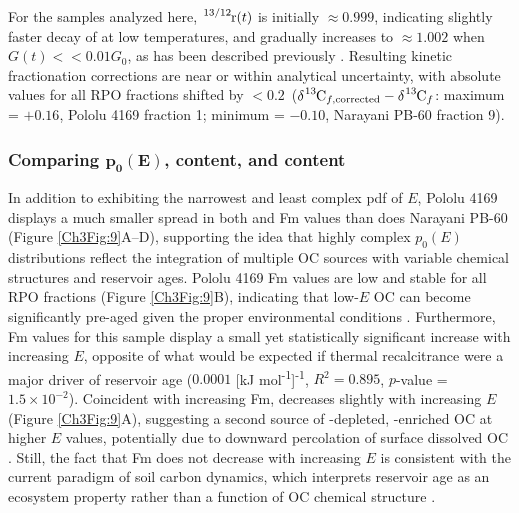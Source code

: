 For the samples analyzed here,  $\ce{^{13/12}r}(t)$ is initially $\approx 0.999$, indicating slightly faster decay of  at low temperatures, and gradually increases to $\approx 1.002$ when $G(t) << 0.01 G_{0}$,  as has been described previously \citep{Cramer:2004tg,Hemingway:2016rc}. Resulting kinetic fractionation corrections are near or within analytical uncertainty, with absolute  values for all RPO fractions shifted by $< 0.2$\textperthousand\ ($\ce{\delta^{13}C}_{f, \text{corrected}} - \ce{\delta^{13}C}_{f}$: maximum = $+0.16$\textperthousand, Pololu 4169 fraction 1; minimum = $-0.10$\textperthousand, Narayani PB-60 fraction 9).

\subsubsection{Comparing $\bm{p_{0}(E)}$,  content, and  content}

In addition to exhibiting the narrowest and least complex pdf of $E$, Pololu 4169 displays a much smaller spread in both  and Fm values than does Narayani PB-60 (Figure \ref{Ch3Fig:9}A--D), supporting the idea that highly complex $p_{0}(E)$ distributions reflect the integration of multiple OC sources with variable chemical structures and reservoir ages. Pololu 4169 Fm values are low and stable for all RPO fractions (Figure \ref{Ch3Fig:9}B), indicating that low-$E$ OC can become significantly pre-aged given the proper environmental conditions \citep{Schmidt:2011gg}. Furthermore, Fm values for this sample display a small yet statistically significant increase with increasing $E$, opposite of what would be expected if thermal recalcitrance were a major driver of reservoir age ($0.0001$ [kJ mol\textsuperscript{-1}]\textsuperscript{-1}, $R^{2} = 0.895$, $p$-value = $1.5 \times 10^{-2}$). Coincident with increasing Fm,  decreases slightly with increasing $E$ (Figure \ref{Ch3Fig:9}A), suggesting a second source of -depleted, -enriched OC at higher $E$ values, potentially due to downward percolation of surface dissolved OC \citep{Chadwick:2007hc}. Still, the fact that Fm does not decrease with increasing $E$ is consistent with the current paradigm of soil carbon dynamics, which interprets reservoir age as an ecosystem property rather than a function of OC chemical structure \citep{Mikutta:2006gx,Janssens:2010hd,Schmidt:2011gg}. 

